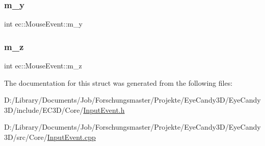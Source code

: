 \mbox{\label{structec_1_1_mouse_event_a70f1a81a4a1099cb425a4461d23dfbba}} 
\subsubsection{\texorpdfstring{m\+\_\+y}{m\_y}}
{\footnotesize\ttfamily int ec\+::\+Mouse\+Event\+::m\+\_\+y}

\mbox{\label{structec_1_1_mouse_event_a6ba4ec5d26b3dbe8be4d57b4197bada2}} 
\subsubsection{\texorpdfstring{m\+\_\+z}{m\_z}}
{\footnotesize\ttfamily int ec\+::\+Mouse\+Event\+::m\+\_\+z}



The documentation for this struct was generated from the following files\+:\begin{DoxyCompactItemize}
\item 
D\+:/\+Library/\+Documents/\+Job/\+Forschungsmaster/\+Projekte/\+Eye\+Candy3\+D/\+Eye\+Candy3\+D/include/\+E\+C3\+D/\+Core/\mbox{\hyperlink{_input_event_8h}{Input\+Event.\+h}}\item 
D\+:/\+Library/\+Documents/\+Job/\+Forschungsmaster/\+Projekte/\+Eye\+Candy3\+D/\+Eye\+Candy3\+D/src/\+Core/\mbox{\hyperlink{_input_event_8cpp}{Input\+Event.\+cpp}}\end{DoxyCompactItemize}
